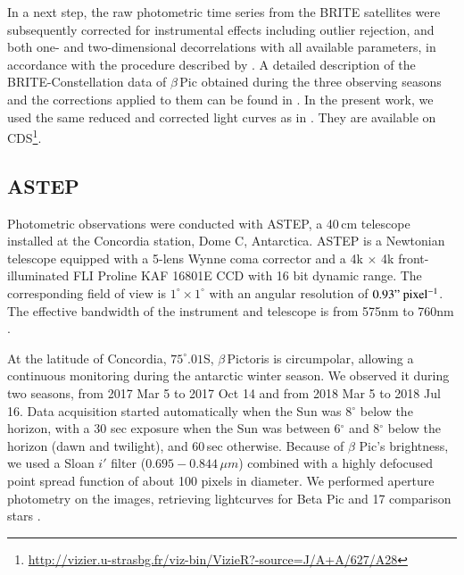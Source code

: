 \documentclass[longauth]{aa} %
\newcommand{\bp}{$\beta$\,Pic}
\begin{document}
In a next step, the raw photometric time series from the BRITE satellites were subsequently corrected for instrumental effects including outlier rejection, and both one- and two-dimensional decorrelations with all available parameters, in accordance with the procedure described by \citet{pigulski2018}.
%
A detailed description of the BRITE-Constellation data of \bp{} obtained during the three observing seasons and the corrections applied to them can be found in \citet{Zwintz19}.
%
In the present work, we used the same reduced and corrected light curves as in \citet{Zwintz19}. They are available on CDS\footnote{\href{http://vizier.u-strasbg.fr/viz-bin/VizieR?-source=J/A+A/627/A28}{http://vizier.u-strasbg.fr/viz-bin/VizieR?-source=J/A+A/627/A28}}.

\subsection{ASTEP}

Photometric observations were conducted with ASTEP, a 40\,cm telescope installed at the Concordia station, Dome C, Antarctica.
%
ASTEP is a Newtonian telescope equipped with a 5-lens Wynne coma corrector and a 4k $\times$ 4k front-illuminated FLI Proline KAF 16801E CCD with 16 bit dynamic range.
%
The corresponding field of view is $1^\circ\times 1^\circ$ with an angular resolution of $0.93"\rm\ pixel^{-1}$.
%
The effective bandwidth of the instrument and telescope is from 575nm to 760nm \citep{Abe13}.

At the latitude of Concordia, $75^{\circ}.01$S, $\beta$\,Pictoris is circumpolar, allowing a continuous monitoring during the antarctic winter season.
%
We observed it during two seasons, from
2017 Mar 5 to 2017 Oct 14 and from 2018 Mar 5 to 2018 Jul 16.
%
Data acquisition started automatically when the Sun was 8$^{\circ}$ below the horizon, with a 30 sec exposure when the Sun was between 6$^{\circ}$ and 8$^{\circ}$ below the horizon (dawn and twilight), and 60\,sec otherwise.
%
Because of $\beta$ Pic's brightness, we used a Sloan $i'$ filter ($0.695-0.844\,\mu m$) combined with a highly defocused point spread function of about 100 pixels in diameter.
%
We performed aperture photometry on the images, retrieving lightcurves for Beta Pic and 17 comparison stars \citep[see][]{Mekarnia2017}.
\end{document}
